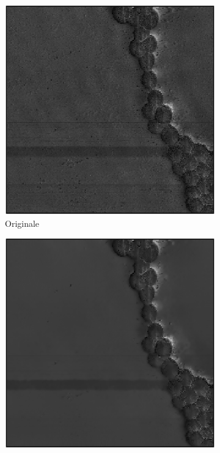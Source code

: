 \documentclass[../main.tex]{subfiles}
\begin{document}
\begin{figure}[ht]
	\centering
	\begin{subfigure}{0.32\linewidth}
		\includegraphics[keepaspectratio, width=\linewidth]{images/sa_o2a.png}
		\caption{Originale}
	\end{subfigure}
	\begin{subfigure}{0.32\linewidth}
		\includegraphics[keepaspectratio, width=\linewidth]{images/nlm_0025.png}

\end{subfigure}
\end{figure}
\end{document}
